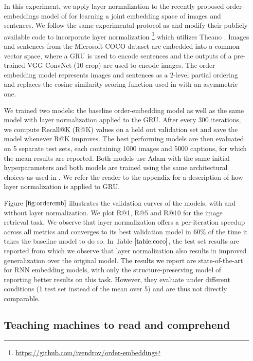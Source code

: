 \documentclass{article}
\begin{document}
In this experiment, we apply layer normalization to the recently proposed order-embeddings model of \citet{vendrov2015order} for learning a joint embedding space of images and sentences. We follow the same experimental protocol as \citet{vendrov2015order} and modify their publicly available code to incorporate layer normalization \footnote{\url{https://github.com/ivendrov/order-embedding}} which utilizes Theano \citep{team2016theano}. Images and sentences from the Microsoft COCO dataset \citep{lin2014microsoft} are embedded into a common vector space, where a GRU \citep{cho2014learning} is used to encode sentences and the outputs of a pre-trained VGG ConvNet \citep{simonyan2014very} (10-crop) are used to encode images. The order-embedding model represents images and sentences as a 2-level partial ordering and replaces the cosine similarity scoring function used in \citet{kiros2014unifying} with an asymmetric one.

We trained two models: the baseline order-embedding model as well as the same model with layer normalization applied to the GRU. After every 300 iterations, we compute Recall@K (R@K) values on a held out validation set and save the model whenever R@K improves. The best performing models are then evaluated on 5 separate test sets, each containing 1000 images and 5000 captions, for which the mean results are reported. Both models use Adam \citep{adam} with the same initial hyperparameters and both models are trained using the same architectural choices as used in \citet{vendrov2015order}. We refer the reader to the appendix for a description of how layer normalization is applied to GRU.

Figure $\ref{fig:orderemb}$ illustrates the validation curves of the models, with and without layer normalization. We plot R@1, R@5 and R@10 for the image retrieval task. We observe that layer normalization offers a per-iteration speedup across all metrics and converges to its best validation model in 60\% of the time it takes the baseline model to do so. In Table $\ref{table:coco}$, the test set results are reported from which we observe that layer normalization also results in improved generalization over the original model. The results we report are state-of-the-art for RNN embedding models, with only the structure-preserving model of \citet{wang2015learning} reporting better results on this task. However, they evaluate under different conditions (1 test set instead of the mean over 5) and are thus not directly comparable.


\subsection{Teaching machines to read and comprehend}
\end{document}
